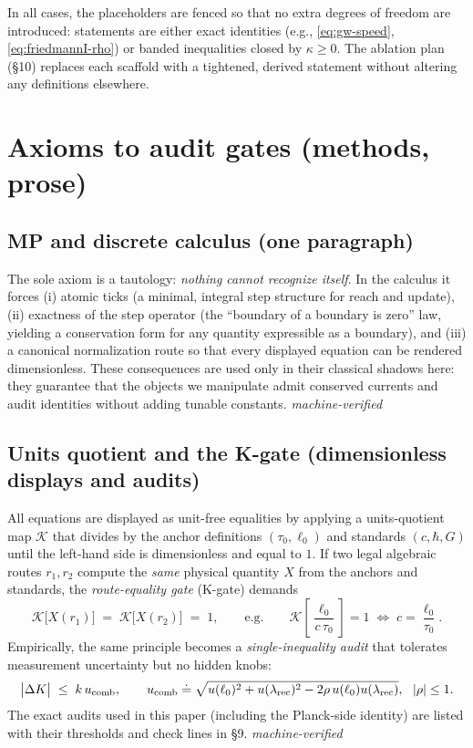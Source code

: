 \documentclass[12pt,a4paper]{article}
\begin{document}
In all cases, the placeholders are fenced so that no extra degrees of freedom are introduced: statements are either exact identities (e.g., \eqref{eq:gw-speed}, \eqref{eq:friedmannI-rho}) or banded inequalities closed by \(\kappa\ge 0\). The ablation plan (§10) replaces each scaffold with a tightened, derived statement without altering any definitions elsewhere.

\section{Axioms to audit gates (methods, prose)}

\subsection{MP and discrete calculus (one paragraph)}
The sole axiom is a tautology: \emph{nothing cannot recognize itself}. In the calculus it forces (i) atomic ticks (a minimal, integral step structure for reach and update), (ii) exactness of the step operator (the “boundary of a boundary is zero” law, yielding a conservation form for any quantity expressible as a boundary), and (iii) a canonical normalization route so that every displayed equation can be rendered dimensionless. These consequences are used only in their classical shadows here: they guarantee that the objects we manipulate admit conserved currents and audit identities without adding tunable constants. \emph{machine-verified}

\subsection{Units quotient and the K-gate (dimensionless displays and audits)}
All equations are displayed as unit-free equalities by applying a units-quotient map \(\mathcal{K}\) that divides by the anchor definitions \((\tau_0,\ell_0)\) and standards \((c,\hbar,G)\) until the left-hand side is dimensionless and equal to \(1\). If two legal algebraic routes \(r_1,r_2\) compute the \emph{same} physical quantity \(X\) from the anchors and standards, the \emph{route-equality gate} (K-gate) demands
\[
\mathcal{K}\!\big[X(r_1)\big] \;=\; \mathcal{K}\!\big[X(r_2)\big] \;=\; 1,
\qquad\text{e.g.}\qquad
\mathcal{K}\!\left[\frac{\ell_0}{c\,\tau_0}\right]=1\;\Longleftrightarrow\;c=\frac{\ell_0}{\tau_0}.
\]
Empirically, the same principle becomes a \emph{single-inequality audit} that tolerates measurement uncertainty but no hidden knobs:
\[
\bigl|\Delta K\bigr|\;\le\;k\,u_{\rm comb},\qquad
u_{\rm comb}\doteq \sqrt{u(\ell_0)^2+u(\lambda_{\rm rec})^2-2\rho\,u(\ell_0)u(\lambda_{\rm rec})},\ \ |\rho|\le 1.
\]
The exact audits used in this paper (including the Planck-side identity) are listed with their thresholds and check lines in §9. \emph{machine-verified}
\end{document}
